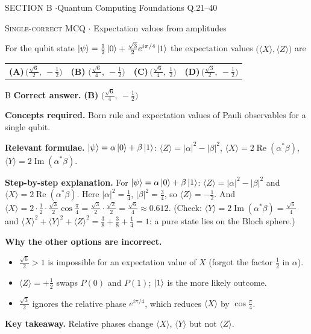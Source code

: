 \documentclass[11pt,a4paper]{article}
\newcommand{\optlabel}[1]{\textbf{(#1)}}
\newcommand{\correctlabel}[1]{\textcolor{okgreen}{\textbf{(#1)}\,\ding{51}}}
\newenvironment{qitem}[1]{\begin{list}{}{\setlength{\leftmargin}{3.3em}\setlength{\labelwidth}{3.1em}%
  \setlength{\labelsep}{0.2em}\setlength{\topsep}{3pt}\setlength{\parsep}{3pt}}\item[\textbf{Q.#1}\hfill]}{\end{list}}
\newcommand{\qsep}{\par\vspace{2pt}{\color{black!15}\hrule}\vspace{4pt}}
\newcommand{\qmeta}[2]{{\footnotesize\color{black!60}\textsc{#1} \;$\cdot$\; #2}\par}
\begin{document}
\newpage

\begin{sectionbanner}SECTION B \enspace$\cdot$\enspace Quantum Computing Foundations \hfill Q.21--40\end{sectionbanner}

\begin{qitem}{21}
\qmeta{Single-correct MCQ}{Expectation values from amplitudes}
For the qubit state $\ket\psi = \frac12\ket0 + \frac{\sqrt3}{2}e^{i\pi/4}\ket1$ the expectation values
$\big(\langle X\rangle, \langle Z\rangle\big)$ are
\par\smallskip\noindent\begin{tabularx}{\linewidth}{@{}*{4}{L}@{}}
\optlabel{A}\,$\big(\tfrac{\sqrt6}{2},\ -\tfrac12\big)$ & \correctlabel{B}\,$\big(\tfrac{\sqrt6}{4},\ -\tfrac12\big)$ & \optlabel{C}\,$\big(\tfrac{\sqrt6}{4},\ \tfrac12\big)$ & \optlabel{D}\,$\big(\tfrac{\sqrt3}{2},\ -\tfrac12\big)$
\end{tabularx}
\end{qitem}
\begin{solbox}{B}
\textbf{\color{brand}Correct answer.} \textcolor{okgreen}{\textbf{(B)}} $\big(\tfrac{\sqrt6}{4},\ -\tfrac12\big)$

\textbf{\color{brand}Concepts required.} Born rule and expectation values of Pauli observables for a single qubit.

\textbf{\color{brand}Relevant formulae.} $\ket\psi = \alpha\ket0 + \beta\ket1$: $\langle Z\rangle = |\alpha|^2 - |\beta|^2$, $\langle X\rangle = 2\operatorname{Re}(\alpha^*\beta)$, $\langle Y\rangle = 2\operatorname{Im}(\alpha^*\beta)$.

\textbf{\color{brand}Step-by-step explanation.} For $\ket\psi = \alpha\ket0 + \beta\ket1$: $\langle Z\rangle = |\alpha|^2 - |\beta|^2$ and $\langle X\rangle = 2\operatorname{Re}(\alpha^*\beta)$.
Here $|\alpha|^2 = \frac14$, $|\beta|^2 = \frac34$, so $\langle Z\rangle = -\frac12$. And
$\langle X\rangle = 2\cdot\frac12\cdot\frac{\sqrt3}{2}\cos\frac\pi4 = \frac{\sqrt3}{2}\cdot\frac{\sqrt2}{2} = \frac{\sqrt6}{4} \approx 0.612$.
(Check: $\langle Y\rangle = 2\operatorname{Im}(\alpha^*\beta) = \frac{\sqrt6}{4}$ and $\langle X\rangle^2 + \langle Y\rangle^2 + \langle Z\rangle^2 = \frac38 + \frac38 + \frac14 = 1$: a pure state lies on the Bloch sphere.)

\textbf{\color{brand}Why the other options are incorrect.}
\begin{itemize}[leftmargin=2.4em, itemsep=1pt, topsep=2pt]
\item[\textbf{(A)}] $\frac{\sqrt6}{2} > 1$ is impossible for an expectation value of $X$ (forgot the factor $\frac12$ in $\alpha$).
\item[\textbf{(C)}] $\langle Z\rangle = +\frac12$ swaps $P(0)$ and $P(1)$; $\ket1$ is the more likely outcome.
\item[\textbf{(D)}] $\frac{\sqrt3}{2}$ ignores the relative phase $e^{i\pi/4}$, which reduces $\langle X\rangle$ by $\cos\frac\pi4$.
\end{itemize}
\textbf{\color{brand}Key takeaway.} Relative phases change $\langle X\rangle$, $\langle Y\rangle$ but not $\langle Z\rangle$.
\end{solbox}
\qsep
\end{document}
